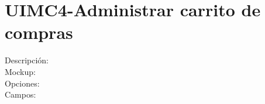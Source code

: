 
\section{UIMC4-Administrar carrito de compras}
\begin{description}
	\item[Descripción:]
	
	\item[Mockup:]\hspace{1pt}
	
	\item[Opciones:]
	
	\item[Campos:]

\end{description}
